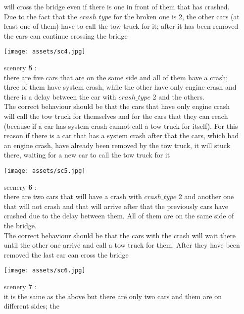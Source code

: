 \begin{itemize}
    will cross the bridge even if there is one in front of them that has crashed. Due to the fact that the 
    $crash\_type$ for the broken one is 2, the other cars (at least one of them) have to call the tow truck for 
    it; after it has been removed the cars can continue crossing the bridge \\
    \begin{center}
        \texttt{[image: assets/sc4.jpg]}
    \end{center}
    \item[scenery \textbf{5}]: \\ there are five cars that are on the same side and all of them have a crash; three of them have system crash, 
    while the other have only engine crash and there is a delay between the car with $crash\_type$ 2 and the others.\\
    The correct behaviour should be that the cars that have only engine crash will call the tow truck for themselves and
    for the cars that they can reach (because if a car has system crash cannot call a tow truck for itself). 
    For this reason if there is a car that has a system crash after that the cars, which had an engine crash, 
    have already been removed by the tow truck, it will stuck there, waiting for a new car to call the tow truck for it\\
    \begin{center}
        \texttt{[image: assets/sc5.jpg]}
    \end{center}
    \item[scenery \textbf{6}]: \\ there are two cars that will have a crash with $crash\_type$ 2 and another one that will not
    crash and that will arrive after that the previously cars have crashed due to the delay between them. All of them are on the same 
    side of the bridge. \\ The correct behaviour should be that the cars with 
    the crash will wait there until the other one arrive and call a tow truck for them. After they have been removed
    the last car can cross the bridge \\
    \begin{center}
        \texttt{[image: assets/sc6.jpg]}
    \end{center}
    \item[scenery \textbf{7}]: \\ it is the same as the above but there are only two cars and them are on different sides; the 

\end{itemize}
